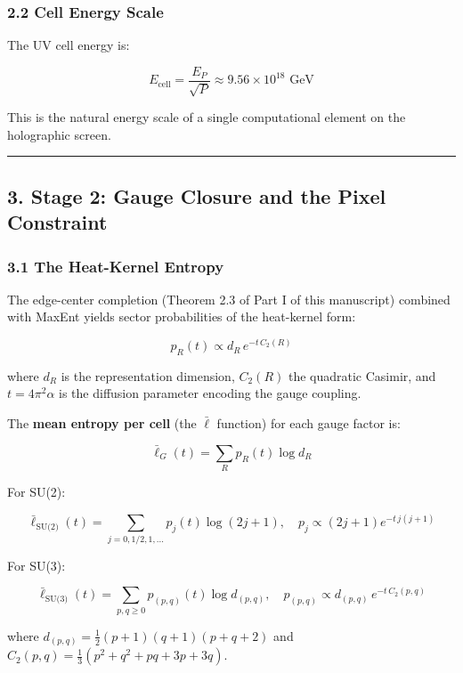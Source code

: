 \subsubsection{2.2 Cell Energy Scale}\label{22-cell-energy-scale}

The UV cell energy is:

\[E_{\text{cell}} = \frac{E_P}{\sqrt{P}} \approx 9.56 \times 10^{18} \text{ GeV}\]

This is the natural energy scale of a single computational element on the holographic screen.

\begin{center}\rule{0.5\linewidth}{0.5pt}\end{center}

\subsection{3. Stage 2: Gauge Closure and the Pixel Constraint}\label{3-stage-2-gauge-closure-and-the-pixel-constraint}

\subsubsection{3.1 The Heat-Kernel Entropy}\label{31-the-heat-kernel-entropy}

The edge-center completion (Theorem 2.3 of Part I of this manuscript) combined with MaxEnt yields sector probabilities of the heat-kernel form:

\[p_R(t) \propto d_R \, e^{-t \, C_2(R)}\]

where \(d_R\) is the representation dimension, \(C_2(R)\) the quadratic Casimir, and \(t = 4\pi^2 \alpha\) is the diffusion parameter encoding the gauge coupling.

The \textbf{mean entropy per cell} (the \(\bar{\ell}\) function) for each gauge factor is:

\[\bar{\ell}_G(t) = \sum_R p_R(t) \log d_R\]

For SU(2):

\[\bar{\ell}_{\text{SU(2)}}(t) = \sum_{j=0,1/2,1,...} p_j(t) \log(2j+1), \quad p_j \propto (2j+1) e^{-t \, j(j+1)}\]

For SU(3):

\[\bar{\ell}_{\text{SU(3)}}(t) = \sum_{p,q \geq 0} p_{(p,q)}(t) \log d_{(p,q)}, \quad p_{(p,q)} \propto d_{(p,q)} \, e^{-t \, C_2(p,q)}\]

where \(d_{(p,q)} = \frac{1}{2}(p+1)(q+1)(p+q+2)\) and \(C_2(p,q) = \frac{1}{3}(p^2 + q^2 + pq + 3p + 3q)\).

